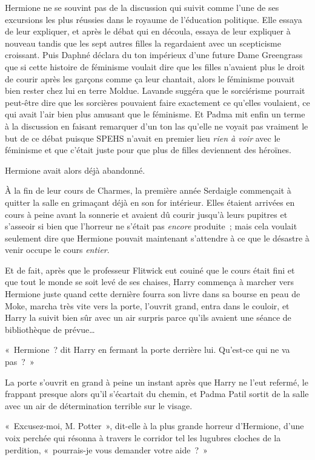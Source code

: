 Hermione ne se souvint pas de la discussion qui suivit comme l'une de ses excursions les plus réussies dans le royaume de l'éducation politique. Elle essaya de leur expliquer, et après le débat qui en découla, essaya de leur expliquer à nouveau tandis que les sept autres filles la regardaient avec un scepticisme croissant. Puis Daphné déclara du ton impérieux d'une future Dame Greengrass que si cette histoire de féminisme voulait dire que les filles n'avaient plus le droit de courir après les garçons comme ça leur chantait, alors le féminisme pouvait bien rester chez lui en terre Moldue. Lavande suggéra que le sorciérisme pourrait peut-être dire que les sorcières pouvaient faire exactement ce qu'elles voulaient, ce qui avait l'air bien plus amusant que le féminisme. Et Padma mit enfin un terme à la discussion en faisant remarquer d'un ton las qu'elle ne voyait pas vraiment le but de ce débat puisque SPEHS n'avait en premier lieu \emph{rien à voir} avec le féminisme et que c'était juste pour que plus de filles deviennent des héroïnes.

Hermione avait alors déjà abandonné.

\later

À la fin de leur cours de Charmes, la première année Serdaigle commençait à quitter la salle en grimaçant déjà en son for intérieur. Elles étaient arrivées en cours à peine avant la sonnerie et avaient dû courir jusqu'à leurs pupitres et s'asseoir si bien que l'horreur ne s'était pas \emph{encore} produite~; mais cela voulait seulement dire que Hermione pouvait maintenant s'attendre à ce que le désastre à venir occupe le cours \emph{entier}.

Et de fait, après que le professeur Flitwick eut couiné que le cours était fini et que tout le monde se soit levé de ses chaises, Harry commença à marcher vers Hermione juste quand cette dernière fourra son livre dans sa bourse en peau de Moke, marcha très vite vers la porte, l'ouvrit grand, entra dans le couloir, et Harry la suivit bien sûr avec un air surpris parce qu'ils avaient une séance de bibliothèque de prévue…

«~Hermione~? dit Harry en fermant la porte derrière lui. Qu'est-ce qui ne va pas~?~»

La porte s'ouvrit en grand à peine un instant après que Harry ne l'eut refermé, le frappant presque alors qu'il s'écartait du chemin, et Padma Patil sortit de la salle avec un air de détermination terrible sur le visage.

«~Excusez-moi, M. Potter~», dit-elle à la plus grande horreur d'Hermione, d'une voix perchée qui résonna à travers le corridor tel les lugubres cloches de la perdition, «~pourrais-je vous demander votre aide~?~»

